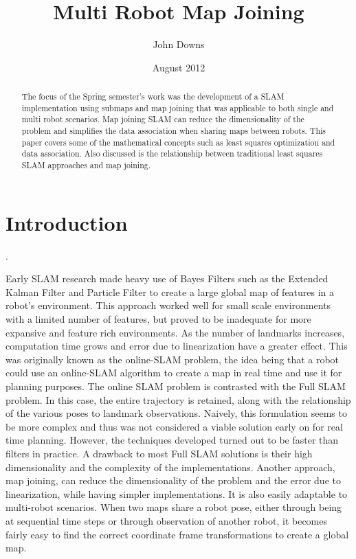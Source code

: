 \documentclass[12pt]{article}
\title{Multi Robot Map Joining}
\author{John Downs}
\date{August 2012}
\begin{document}
\maketitle

\begin{abstract}
The focus of the Spring semester’s work was the development of a SLAM implementation using submaps and map joining that was applicable to both single and multi robot scenarios.  Map joining SLAM can reduce the dimensionality of the problem and simplifies the data association when sharing maps between robots.  This paper covers some of the mathematical concepts such as least squares optimization and data association.  Also discussed is the relationship between traditional least squares SLAM approaches and map joining.
\end{abstract}

\section{Introduction}
\cite{cheeseman1987stochastic}.  

Early SLAM research made heavy use of Bayes Filters such as the Extended Kalman Filter and Particle Filter to create a large global map of features in a robot’s environment.  This approach worked well for small scale environments with a limited number of features, but proved to be inadequate for more expansive and feature rich environments.  As the number of landmarks increases, computation time grows and error due to linearization have a greater effect.  This was originally known as the online-SLAM problem, the idea being that a robot could use an online-SLAM algorithm to create a map in real time and use it for planning purposes.  
The online SLAM problem is contrasted with the Full SLAM problem.  In this case, the entire trajectory is retained, along with the relationship of the various poses to landmark observations.  Naively, this formulation seems to be more complex and thus was not considered a viable solution early on for real time planning.  However, the techniques developed turned out to be faster than filters in practice.  
A drawback to most Full SLAM solutions is their high dimensionality and the complexity of the implementations.  Another approach, map joining, can reduce the dimensionality of the problem and the error due to linearization, while having simpler implementations.  It is also easily adaptable to multi-robot scenarios.  When two maps share a robot pose, either through being at sequential time steps or through observation of another robot, it becomes fairly easy to find the correct coordinate frame transformations to create a global map.
\end{document}
